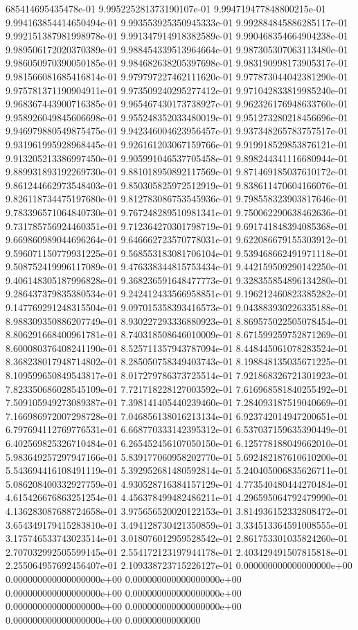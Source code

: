 685414695435478e-01	9.995225281373190107e-01	9.994719477848800215e-01	9.994163854414650494e-01	9.993553925350945333e-01	9.992884845886285117e-01	9.992151387981998978e-01	9.991347914918382589e-01	9.990468354664904238e-01	9.989506172020370389e-01	9.988454339513964664e-01	9.987305307063113480e-01	9.986050970390050185e-01	9.984682638205397698e-01	9.983190998173905317e-01	9.981566081685416814e-01	9.979797227462111620e-01	9.977873044042381290e-01	9.975781371190904911e-01	9.973509240295277412e-01	9.971042833819985240e-01	9.968367443900716385e-01	9.965467430173738927e-01	9.962326176948633760e-01	9.958926049845606698e-01	9.955248352033480019e-01	9.951273280218456696e-01	9.946979880549875475e-01	9.942346004623956457e-01	9.937348265783757517e-01	9.931961995928968445e-01	9.926161203067159766e-01	9.919918529853876121e-01	9.913205213386997450e-01	9.905991046537705458e-01	9.898244341116680944e-01	9.889931893192269730e-01	9.881018950892117569e-01	9.871469185037610172e-01	9.861244662973548403e-01	9.850305825972512919e-01	9.838611470604166076e-01	9.826118734475197680e-01	9.812783086753545936e-01	9.798558323903817646e-01	9.783396571064840730e-01	9.767248289510981341e-01	9.750062290638462636e-01	9.731785756924460351e-01	9.712364270301798719e-01	9.691741848394085368e-01	9.669860989044696264e-01	9.646662723570778031e-01	9.622086679155303912e-01	9.596071150779931225e-01	9.568553183081706104e-01	9.539468662491971118e-01	9.508752419996117089e-01	9.476338344815753434e-01	9.442159509290142250e-01	9.406148305187996828e-01	9.368236591648477773e-01	9.328355854896134280e-01	9.286437379835380534e-01	9.242412433566958851e-01	9.196212460823385282e-01	9.147769291248315504e-01	9.097015358393416573e-01	9.043883930226335188e-01	8.988309350886207749e-01	8.930227293336880923e-01	8.869575022505078454e-01	8.806291668400961781e-01	8.740318508646010009e-01	8.671599259752871269e-01	8.600080376408241190e-01	8.525711357943787094e-01	8.448445061078283524e-01	8.368238017948714802e-01	8.285050758349403743e-01	8.198848135035671225e-01	8.109599650849543817e-01	8.017279786373725514e-01	7.921868326721301923e-01	7.823350686028545109e-01	7.721718228127003592e-01	7.616968581840255492e-01	7.509105949273089387e-01	7.398141405440239460e-01	7.284093187519040669e-01	7.166986972007298728e-01	7.046856138016213134e-01	6.923742014947200651e-01	6.797694112769776531e-01	6.668770333142395312e-01	6.537037159635390449e-01	6.402569825326710484e-01	6.265452456107050150e-01	6.125778188049662010e-01	5.983649257297947166e-01	5.839177060958202770e-01	5.692482187610610200e-01	5.543694416108491119e-01	5.392952681480592814e-01	5.240405006835626711e-01	5.086208400332927759e-01	4.930528716384157129e-01	4.773540480444270484e-01	4.615426676863251254e-01	4.456378499482486211e-01	4.296595064792479990e-01	4.136283087688724658e-01	3.975656520020122153e-01	3.814936152332808472e-01	3.654349179415283810e-01	3.494128730421350859e-01	3.334513364591008555e-01	3.175746533743023514e-01	3.018076012959528542e-01	2.861753301035824260e-01	2.707032992505599145e-01	2.554172123197944178e-01	2.403429491507815818e-01	2.255064957692456407e-01	2.109338723715226127e-01	0.000000000000000000e+00	0.000000000000000000e+00	0.000000000000000000e+00	0.000000000000000000e+00	0.000000000000000000e+00	0.000000000000000000e+00	0.000000000000000000e+00	0.000000000000000000e+00	0.00000000000000